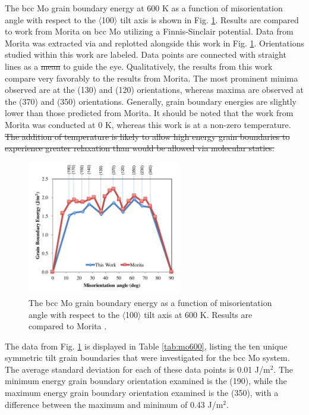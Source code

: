 \documentclass[review]{elsarticle}
\providecommand{\DIFaddtex}[1]{{\protect\color{blue}\uwave{#1}}} %
\providecommand{\DIFdeltex}[1]{{\protect\color{red}\sout{#1}}}                      %
\providecommand{\DIFaddbegin}{} %
\providecommand{\DIFaddend}{} %
\providecommand{\DIFdelbegin}{} %
\providecommand{\DIFdelend}{} %
\providecommand{\DIFadd}[1]{\texorpdfstring{\DIFaddtex{#1}}{#1}} %
\providecommand{\DIFdel}[1]{\texorpdfstring{\DIFdeltex{#1}}{}} %
\newcommand{\DIFscaledelfig}{0.5}
\newlength{\DIFdelgraphicswidth} %
\newlength{\DIFdelgraphicsheight} %
\newcommand{\DIFaddincludegraphics}[2][]{{\color{blue}\fbox{\DIFOincludegraphics[#1]{#2}}}} %
\newcommand{\DIFdelincludegraphics}[2][]{%
\sbox{\DIFdelgraphicsbox}{\DIFOincludegraphics[#1]{#2}}%
\settoboxwidth{\DIFdelgraphicswidth}{\DIFdelgraphicsbox} %
\settoboxtotalheight{\DIFdelgraphicsheight}{\DIFdelgraphicsbox} %
\scalebox{\DIFscaledelfig}{%
\parbox[b]{\DIFdelgraphicswidth}{\usebox{\DIFdelgraphicsbox}\\[-\baselineskip] \rule{\DIFdelgraphicswidth}{0em}}\llap{\resizebox{\DIFdelgraphicswidth}{\DIFdelgraphicsheight}{%
\setlength{\unitlength}{\DIFdelgraphicswidth}%
\begin{picture}(1,1)%
\thicklines\linethickness{2pt} %
{\color[rgb]{1,0,0}\put(0,0){\framebox(1,1){}}}%
{\color[rgb]{1,0,0}\put(0,0){\line( 1,1){1}}}%
{\color[rgb]{1,0,0}\put(0,1){\line(1,-1){1}}}%
\end{picture}%
}\hspace*{3pt}}} %
} %
\DeclareRobustCommand{\DIFaddbegin}{\DIFOaddbegin \let\includegraphics\DIFaddincludegraphics} %
\DeclareRobustCommand{\DIFaddend}{\DIFOaddend \let\includegraphics\DIFOincludegraphics} %
\DeclareRobustCommand{\DIFdelbegin}{\DIFOdelbegin \let\includegraphics\DIFdelincludegraphics} %
\DeclareRobustCommand{\DIFdelend}{\DIFOaddend \let\includegraphics\DIFOincludegraphics} %
\begin{document}
The bcc Mo grain boundary energy at 600 K as a function of misorientation angle with respect to the $\langle$100$\rangle$ tilt axis is shown in Fig. \ref{fig:mo600}. Results are compared to work from Morita \cite{morita1997} on bcc Mo utilizing a Finnis-Sinclair \cite{finnis} potential. Data from Morita \cite{morita1997} was extracted via \DIFaddbegin \DIFadd{WebPlotDigitizer }\DIFaddend \cite{webplot} and replotted alongside this work in Fig. \ref{fig:mo600}. Orientations studied within this work are labeled. Data points are connected with straight lines as a \DIFdelbegin \DIFdel{mean }\DIFdelend \DIFaddbegin \DIFadd{means }\DIFaddend to guide the eye. Qualitatively, the results from this work compare very favorably to the results from Morita. The most prominent minima observed are at the (130) and (120) orientations, whereas maxima are observed at the (370) and (350) orientations. Generally, grain boundary energies are slightly lower than those predicted from Morita. It should be noted that the work from Morita was conducted at 0 K, whereas this work is at a non-zero temperature. 
\DIFdelbegin \DIFdel{The addition of temperature is likely to allow high energy grain boundaries to experience greater relaxation than would be allowed via molecular statics. 
}\DIFdelend 

\begin{figure}[h]
 \centering
 \includegraphics[width=0.6\textwidth]{mo600A.png} 
 \caption{The bcc Mo grain boundary energy as a function of misorientation angle with respect to the $\langle$100$\rangle$ tilt axis at 600 K. Results are compared to Morita \cite{morita1997}.}
 \label{fig:mo600}
\end{figure}

\FloatBarrier

The data from Fig. \ref{fig:mo600} is displayed in Table \ref{tab:mo600}, listing the ten unique symmetric tilt grain boundaries that were investigated for the bcc Mo system. The average standard deviation for each of these data points is 0.01 J/m$^{2}$. The minimum energy grain boundary orientation examined is the (190), while the maximum energy grain boundary orientation examined is the (350), with a difference between the maximum and minimum of 0.43 J/m$^{2}$.
\end{document}
